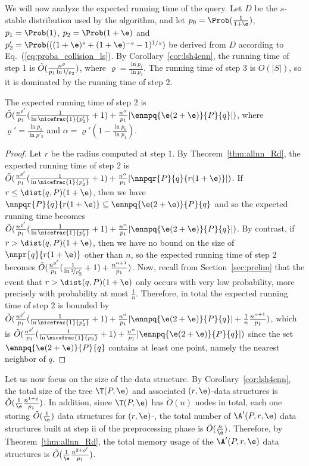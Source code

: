 We will now analyze the expected running time of the query. Let $D$ be
the $s$-stable distribution used by the algorithm, and let
$p_0=\Prob(\frac{1}{1+\e})$, $p_1=\Prob(1)$, $p_2=\Prob(1+\e)$ and
$p'_2=\Prob(((1+\e)^s+(1+\e)^{-s}-1)^{1/s})$ be derived from $D$ according
to Eq.~(\ref{eq:proba_collision_ls}). By Corollary~\ref{cor:lsh4enn},
the running time of step 1 is $\tilde O(\frac{n^\varrho}{p_1 \ln
  \nicefrac{1}{p_2}})$, where $\varrho=\frac{\ln p_1}{\ln p_2}$. The
running time of step 3 is $O(|S|)$, so it is dominated by the running
time of step 2.
\begin{lem}\label{lem:exact-nn_runtime}
The expected running time of step 2 is $\tilde
O(\frac{n^{\varrho'}}{p_1}(\frac{1}{\ln\nicefrac{1}{p'_2}} + 1) +
\frac{n^\alpha}{p_1}|\ennpq{\e(2+\e)}{P}{q}|)$, where
$\varrho'=\frac{\ln p_1}{\ln p'_2}$ and $\alpha=\varrho' (1-\frac{\ln
  p_0}{\ln p_1})$.
\end{lem}
\begin{proof}
Let $r$ be the radius computed at step 1. By
Theorem~\ref{thm:allnn_Rd}, the expected running time of step 2 is
$\tilde O(\frac{n^{\varrho'}}{p_1}(\frac{1}{\ln\nicefrac{1}{p'_2}}+1)
+ \frac{n^\alpha}{p_1} |\nnpqr{P}{q}{r(1+\e)}|)$. If $r\leq \dist(q,P)(1+\e)$,
then we have $\nnpqr{P}{q}{r(1+\e)}\subseteq \ennpq{\e(2+\e)}{P}{q}$
and so the expected running time becomes $\tilde
O(\frac{n^{\varrho'}}{p_1}(\frac{1}{\ln\nicefrac{1}{p'_2}}+1) +
\frac{n^\alpha}{p_1} |\ennpq{\e(2+\e)}{P}{q}|)$.  By contrast, if $r>
\dist(q,P)(1+\e)$, then we have no bound on the size of
$\nnpr{q}{r(1+\e)}$ other than $n$, so the expected running time of
step 2 becomes $\tilde
O(\frac{n^{\varrho'}}{p_1}(\frac{1}{\ln\nicefrac{1}{p'_2}}+1) +
\frac{n^{\alpha+1}}{p_1})$. Now, recall from Section~\ref{sec:prelim} that the
event that $r> \dist(q,P)(1+\e)$ only occurs with very low
probability, more precisely with probability at most
$\frac{1}{n}$. Therefore, in total the expected running time of step 2
is bounded by $\tilde
O(\frac{n^{\varrho'}}{p_1}(\frac{1}{\ln\nicefrac{1}{p'_2}}+1) +
\frac{n^\alpha}{p_1} |\ennpq{\e(2+\e)}{P}{q}| + \frac{1}{n}
\frac{n^{\alpha+1}}{p_1})$, which is $\tilde
O(\frac{n^{\varrho'}}{p_1}(\frac{1}{\ln\nicefrac{1}{p_2}}+ 1) +
\frac{n^\alpha}{p_1} |\ennpq{\e(2+\e)}{P}{q}|)$ since the set
$\ennpq{\e(2+\e)}{P}{q}$ contains at least one point, namely the
nearest neighbor of $q$.
\end{proof}

Let us now focus on the size of the data structure. By
Corollary~\ref{cor:lsh4enn}, the total size of the tree $\T(P,\e)$ and
associated $(r,\e)$-\pleb data structures is $\tilde O(\frac{1}{\e}
\frac{n^{1+\varrho}}{p_1})$. In addition, since $\T(P,\e)$ has $\tilde O(n)$ nodes
in total, each one storing $\tilde O(\frac{1}{\e})$ data structures
for $(r,\e)$-\pleb, the total number of $\A'(P,r,\e)$ data structures
built at step ii of the preprocessing phase is $\tilde
O(\frac{n}{\e})$. Therefore, by Theorem~\ref{thm:allnn_Rd}, the total
memory usage of the $\A'(P,r,\e)$ data structures is $\tilde
O(\frac{1}{\e}\frac{n^{2+\varrho'}}{p_1})$. 

